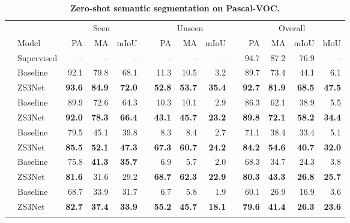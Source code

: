 \documentclass{article}
\begin{document}
\begin{table} 
\caption{\small \textbf{Zero-shot semantic segmentation on Pascal-VOC.\vspace{3pt}}}
\small{
\begin{tabular}{clrrrrrrrrrrrr}  \toprule
 & & \multicolumn{3}{c}{Seen}  && \multicolumn{3}{c}{Unseen} && \multicolumn{4}{c}{Overall} \\ \cline{3-5} \cline{7-9} \cline{11-14} \noalign{\smallskip}
  &  Model  &  PA    &  MA    &  mIoU  &&  PA    &  MA  &  mIoU   &&  PA    &  MA & mIoU  & hIoU \\ \midrule[1.1pt]
 & Supervised & -- & --  & -- && -- & -- & -- && 94.7  & 87.2 & 76.9 & -- \\ \hline\noalign{\smallskip}
 \multirow{3}{*}{2} & Baseline  & 92.1 & 79.8  & 68.1  && 11.3 & 10.5 & 3.2 && 89.7  & 73.4 & 44.1 & 6.1 \\ 
                    & ZS3Net    & \bf 93.6 &  \bf 84.9  & \bf 72.0  && \bf 52.8 & \bf 53.7  & \bf 35.4 && \bf 92.7 & \bf 81.9 & \bf 68.5  & \bf 47.5 \\ \hline\noalign{\smallskip}
 \multirow{3}{*}{4} & Baseline  & 89.9 & 72.6  & 64.3 && 10.3  & 10.1  & 2.9  && 86.3  & 62.1 & 38.9 & 5.5\\ 
                    & ZS3Net    & \bf 92.0 & \bf  78.3 & \bf 66.4  && \bf 43.1 &  \bf 45.7 & \bf 23.2 &&  \bf 89.8 & \bf 72.1  & \bf 58.2 & \bf 34.4  \\ \hline\noalign{\smallskip}
 \multirow{3}{*}{6} & Baseline  & 79.5 & 45.1  & 39.8 && 8.3 & 8.4 & 2.7 && 71.1 & 38.4 & 33.4 &  5.1\\ 
                    & ZS3Net     & \bf 85.5 & \bf  52.1  & \bf  47.3 && \bf 67.3  & \bf 60.7  &\bf  24.2 && \bf 84.2 & \bf 54.6 & \bf 40.7   & \bf 32.0 \\ \hline\noalign{\smallskip}
 \multirow{3}{*}{8} & Baseline  & 75.8 & \bf 41.3  & \bf 35.7 && 6.9  & 5.7 & 2.0 &&  68.3 & 34.7 &   24.3 & 3.8\\ 
                    & ZS3Net     & \bf 81.6 &   31.6 &  29.2  && \bf 68.7  & \bf  62.3 & \bf 22.9 && \bf 80.3 & \bf 43.3 & \bf 26.8 & \bf 25.7  \\ \hline\noalign{\smallskip}
 \multirow{3}{*}{10}& Baseline  & 68.7 & 33.9  & 31.7  && 6.7 & 5.8 & 1.9  && 60.1  & 26.9 & 16.9 & 3.6\\ 
                     & ZS3Net     & \bf 82.7  &  \bf 37.4 & \bf 33.9 && \bf 55.2 & \bf  45.7 & \bf 18.1  && \bf 79.6 & \bf 41.4 & \bf 26.3  & \bf 23.6  \\ \bottomrule 
\vspace{-0.5cm}
\end{tabular}
}
\label{pascalvoc_res}
\end{table}
\end{document}
